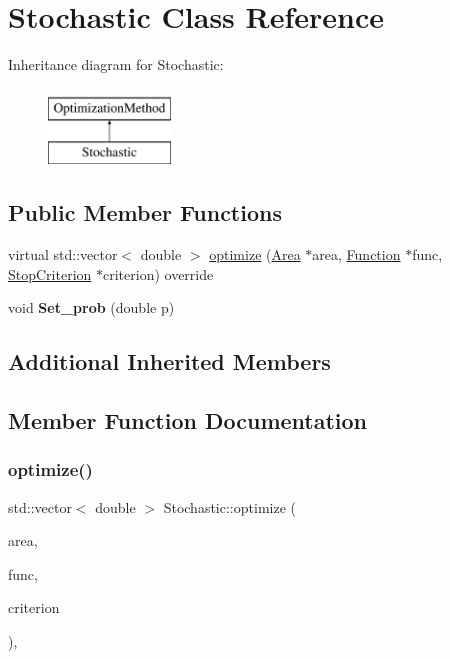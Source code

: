 \hypertarget{class_stochastic}{}\section{Stochastic Class Reference}
\label{class_stochastic}
Inheritance diagram for Stochastic\+:\begin{figure}[H]
\begin{center}
\leavevmode
\includegraphics[height=2.000000cm]{class_stochastic}
\end{center}
\end{figure}
\subsection*{Public Member Functions}
\begin{DoxyCompactItemize}
\item 
virtual std\+::vector$<$ double $>$ \mbox{\hyperlink{class_stochastic_a7a219f4e02daecd5c8c185de0df80353}{optimize}} (\mbox{\hyperlink{class_area}{Area}} $\ast$area, \mbox{\hyperlink{class_function}{Function}} $\ast$func, \mbox{\hyperlink{class_stop_criterion}{Stop\+Criterion}} $\ast$criterion) override
\item 
\mbox{\label{class_stochastic_ad66c12f98a754caea907d5df26af56ef}} 
void {\bfseries Set\+\_\+prob} (double p)
\end{DoxyCompactItemize}
\subsection*{Additional Inherited Members}


\subsection{Member Function Documentation}
\mbox{\label{class_stochastic_a7a219f4e02daecd5c8c185de0df80353}} 
\subsubsection{\texorpdfstring{optimize()}{optimize()}}
{\footnotesize\ttfamily std\+::vector$<$ double $>$ Stochastic\+::optimize (\begin{DoxyParamCaption}\item[{\mbox{\hyperlink{class_area}{Area}} $\ast$}]{area,  }\item[{\mbox{\hyperlink{class_function}{Function}} $\ast$}]{func,  }\item[{\mbox{\hyperlink{class_stop_criterion}{Stop\+Criterion}} $\ast$}]{criterion }\end{DoxyParamCaption})\hspace{0.3cm}{\ttfamily [override]}, {\ttfamily [virtual]}}

